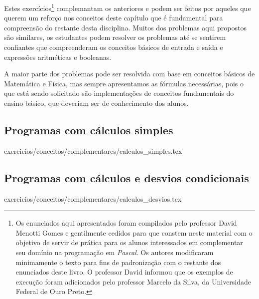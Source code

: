 Estes exercícios\footnote{Os enunciados aqui apresentados foram compilados
pelo professor David Menotti Gomes e gentilmente cedidos para que 
constem neste material com o objetivo de servir de prática para os alunos
interessados em complementar seu domínio na programação em \emph{Pascal}.
Os autores modificaram minimamente o texto para fins de padronização com 
o restante dos enunciados deste livro. O professor David informou que 
os exemplos de execução foram adicionados pelo professor Marcelo da Silva, 
da Universidade Federal de Ouro Preto.}
complemantam os anteriores e podem ser feitos por aqueles
que querem um reforço nos conceitos deste capítulo que
é fundamental para compreensão do restante desta disciplina. Muitos
dos problemas aqui propostos são similares, os estudantes podem resolver
os problemas até se sentirem confiantes que compreenderam os conceitos
básicos de entrada e saída e expressões aritméticas e booleanas.

A maior parte dos problemas pode ser resolvida com base em conceitos 
básicos de Matemática e Física, mas sempre apresentamos as fórmulas
necessárias, pois o que está sendo solicitado são implementações de
conceitos fundamentais do ensino básico, que deveriam ser de conhecimento
dos alunos. 

\subsection{Programas com cálculos simples}
\begin{enumerate}
 {exercicios/conceitos/complementares/calculos_simples.tex}
\end{enumerate}

\subsection{Programas com cálculos e desvios condicionais}
\begin{enumerate}
 {exercicios/conceitos/complementares/calculos_desvios.tex}
\end{enumerate}

